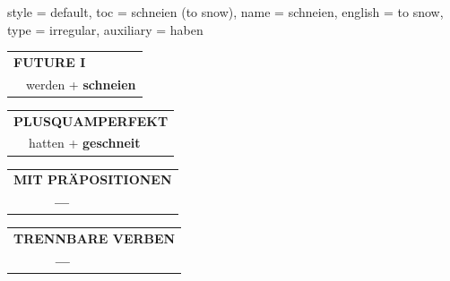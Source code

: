 \begin{verbentry}{
  style = {default},
  toc = {schneien (to snow)},
  name = {schneien},
  english = {to snow},
  type = {irregular},
  auxiliary = {haben}
}
\begin{tabular}{rl}
    \multicolumn{2}{l}{\textbf{FUTURE I} }\\
  &  werden + \textbf{schneien}\\
 
  \end{tabular}
\hfill
   \begin{tabular}{rl}
      \multicolumn{2}{l}{\textbf{PLUSQUAMPERFEKT}}\\
  &  hatten + \textbf{geschneit}\\
  \end{tabular}
  
  \vspace{10pt}



\begin{tabular}{lll}
\multicolumn{3}{l}{\textbf{MIT PRÄPOSITIONEN}}\\
& \textbf{---} & \\
\end{tabular}
\hfill
\begin{tabular}{lll}
\multicolumn{3}{l}{\textbf{TRENNBARE VERBEN}}\\
& \textbf{---} & \\
\end{tabular}

  \vspace{-5pt}
\end{verbentry}


